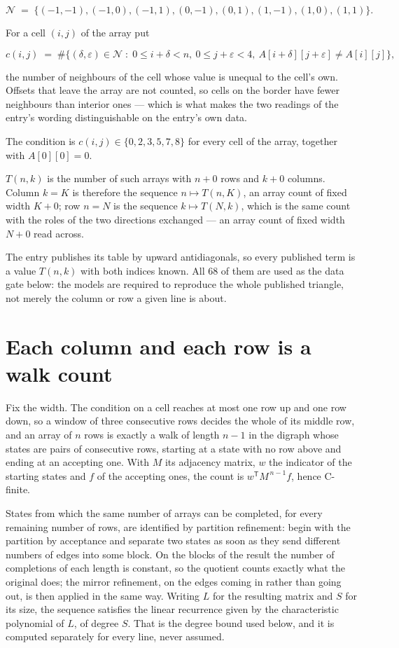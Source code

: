 \documentclass[11pt]{article}
\theoremstyle{definition}
\begin{document}
\[\mathcal{N} \;=\; \{(-1,-1), (-1,0), (-1,1), (0,-1), (0,1), (1,-1), (1,0), (1,1)\}.\]

For a cell $(i,j)$ of the array put

\[c(i,j) \;=\; \#\bigl\{(\delta,\varepsilon)\in\mathcal{N} \;:\; 0\le i+\delta<n,\ 0\le j+\varepsilon<4,\ A[i+\delta][j+\varepsilon] \neq A[i][j]\bigr\},\]

the number of neighbours of the cell whose value is unequal to the cell's own. Offsets that leave the array are not counted, so cells on the border have fewer neighbours than interior ones --- which is what makes the two readings of the entry's wording distinguishable on the entry's own data.

The condition is $c(i,j) \in \{0, 2, 3, 5, 7, 8\}$ for every cell of the array, together with $A[0][0]=0$.

$T(n,k)$ is the number of such arrays with $n + 0$ rows and $k + 0$ columns. Column $k = K$ is therefore the sequence $n \mapsto T(n,K)$, an array count of fixed width $K + 0$; row $n = N$ is the sequence $k \mapsto T(N,k)$, which is the same count with the roles of the two directions exchanged --- an array count of fixed width $N + 0$ read across.

The entry publishes its table by upward antidiagonals, so every published term is a value $T(n,k)$ with both indices known. All 68 of them are used as the data gate below: the models are required to reproduce the whole published triangle, not merely the column or row a given line is about.

\section{Each column and each row is a walk count}

Fix the width. The condition on a cell reaches at most one row up and one row down, so a window of three consecutive rows decides the whole of its middle row, and an array of $n$ rows is exactly a walk of length $n-1$ in the digraph whose states are pairs of consecutive rows, starting at a state with no row above and ending at an accepting one. With $M$ its adjacency matrix, $w$ the indicator of the starting states and $f$ of the accepting ones, the count is $w^{\mathsf T}M^{\,n-1}f$, hence C-finite.

States from which the same number of arrays can be completed, for every remaining number of rows, are identified by partition refinement: begin with the partition by acceptance and separate two states as soon as they send different numbers of edges into some block. On the blocks of the result the number of completions of each length is constant, so the quotient counts exactly what the original does; the mirror refinement, on the edges coming in rather than going out, is then applied in the same way. Writing $L$ for the resulting matrix and $S$ for its size, the sequence satisfies the linear recurrence given by the characteristic polynomial of $L$, of degree $S$. That is the degree bound used below, and it is computed separately for every line, never assumed.
\end{document}
